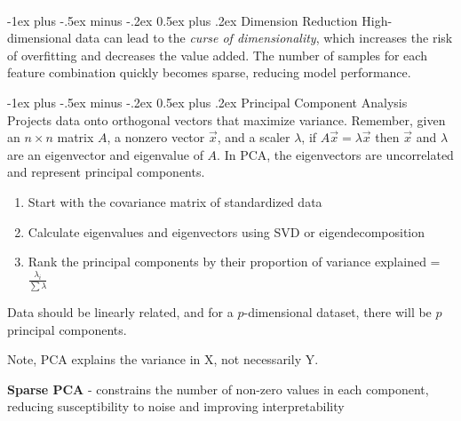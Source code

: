 \documentclass[10pt,landscape]{article}
\makeatletter
\renewcommand{\section}{\@startsection{section}{1}{0mm}%
                                {-1ex plus -.5ex minus -.2ex}%
                                {0.5ex plus .2ex}%
                                {\normalfont\large\bfseries}}
\renewcommand{\subsection}{\@startsection{subsection}{2}{0mm}%
                                {-1ex plus -.5ex minus -.2ex}%
                                {0.5ex plus .2ex}%
                                {\normalfont\normalsize\bfseries}}
\makeatother
\begin{document}
\begin{multicols}{3}
    \textcolor{white}{.}\vspace{-5mm}\\ %
    \section{Dimension Reduction}
    High-dimensional data can lead to the \emph{curse of dimensionality}, which increases the risk of overfitting and decreases the value added. The number of samples for each feature combination quickly becomes sparse, reducing model performance.

    \subsection{Principal Component Analysis}
    Projects data onto orthogonal vectors that maximize variance.
    Remember, given an $n\times n$ matrix $A$, a nonzero vector $\vec{x}$, and a scaler $\lambda$, if $A\vec{x} = \lambda \vec{x}$ then $\vec{x}$ and $\lambda$ are an eigenvector and eigenvalue of $A$. In PCA, the eigenvectors are uncorrelated and represent principal components.
    \begin{enumerate}[leftmargin=5mm]
        \itemsep -.4mm
        \item Start with the covariance matrix of standardized data
        \item Calculate eigenvalues and eigenvectors using SVD or eigendecomposition
        \item Rank the principal components by their proportion of variance explained = $\frac{\lambda_i}{\sum{\lambda}}$
    \end{enumerate}

    Data should be linearly related, and for a $p$-dimensional dataset, there will be $p$ principal components.

    Note, PCA explains the variance in X, not necessarily Y.

    \textbf{Sparse PCA} - constrains the number of non-zero values in each component, reducing susceptibility to noise and improving interpretability

\end{multicols}
\end{document}
